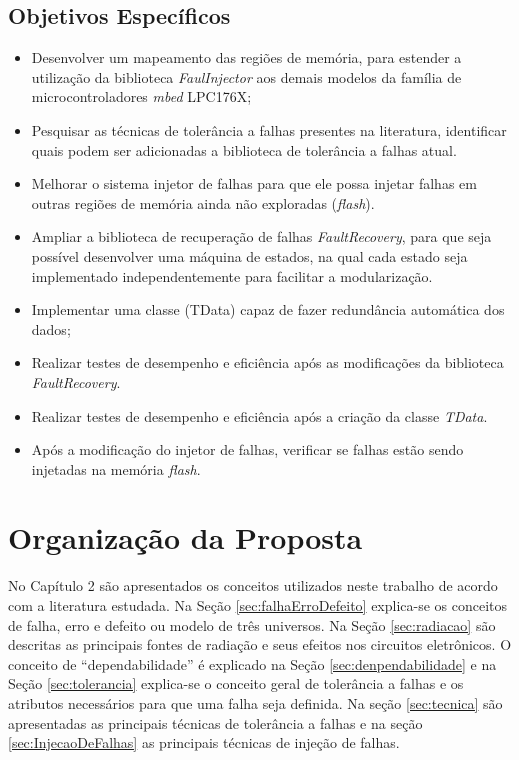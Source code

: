 \subsection{Objetivos Específicos}\label{Sec:ObjetivosEspecificos}
\begin{itemize}
	
	\item  Desenvolver um mapeamento das regiões de memória, para estender a utilização da biblioteca \textit{FaulInjector} aos demais modelos da família de microcontroladores \textit{mbed} LPC176X;
	
	\item Pesquisar as técnicas de tolerância a falhas presentes na literatura, identificar quais podem ser adicionadas a biblioteca de tolerância a falhas atual. 
	
	\item Melhorar o sistema injetor de falhas para que ele possa injetar falhas em outras regiões de memória ainda não exploradas (\textit{flash}).	
	
	\item Ampliar a biblioteca de recuperação de falhas \textit{FaultRecovery}, para que seja possível desenvolver uma máquina de estados, na qual cada estado seja implementado independentemente para facilitar a modularização.
	
	\item Implementar uma classe (TData) capaz de fazer redundância automática dos dados;
	
	\item Realizar testes de desempenho e eficiência após as modificações da biblioteca \textit{FaultRecovery}.
	
	\item Realizar testes de desempenho e eficiência após a criação da classe \textit{TData}.
	
	\item Após a modificação do injetor de falhas, verificar se falhas estão sendo injetadas na memória \textit{flash}. 						
	
\end{itemize}


\newpage

\section{Organização da Proposta} \label{Sec:Organizacao}

No Capítulo 2 são apresentados os conceitos utilizados neste trabalho de acordo com a literatura estudada. Na Seção \ref{sec:falhaErroDefeito} explica-se os conceitos de falha, erro e defeito ou modelo de três universos. Na Seção \ref{sec:radiacao} são descritas as principais fontes de radiação e seus efeitos nos circuitos eletrônicos.  O conceito de ``dependabilidade'' é explicado na Seção \ref{sec:denpendabilidade} e na Seção \ref{sec:tolerancia} explica-se o conceito geral de tolerância a falhas e os atributos necessários para que uma falha seja definida. Na seção \ref{sec:tecnica} são apresentadas as principais técnicas de tolerância a falhas e na seção \ref{sec:InjecaoDeFalhas} as principais técnicas de injeção de falhas.

